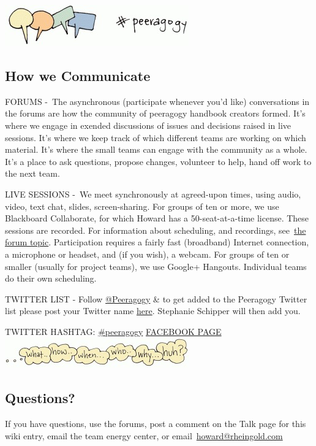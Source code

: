 \textbf{\href{http://peeragogy.org/wp-content/uploads/2012/03/communicate\_color1.gif}{\includegraphics{../pictures/communicate.jpg}}}

\subsection{How we Communicate}

FORUMS -~The asynchronous (participate whenever you'd like)
conversations in the forums are how the community of peeragogy handbook
creators formed. It's where we engage in exended discussions of issues
and decisions raised in live sessions. It's where we keep track of which
different teams are working on which material. It's where the small
teams can engage with the community as a whole. It's a place to ask
questions, propose changes, volunteer to help, hand off work to the next
team.

LIVE SESSIONS -~We meet synchronously at agreed-upon times, using audio,
video, text chat, slides, screen-sharing. For groups of ten or more, we
use Blackboard Collaborate, for which Howard has a 50-seat-at-a-time
license. These sessions are recorded. For information about scheduling,
and recordings,
see~\href{http://socialmediaclassroom.com/host/peeragogy/forum/live-sessions-schedule-recordings-notes-mindmaps}{the
forum topic}. Participation requires a fairly fast (broadband) Internet
connection, a microphone or headset, and (if you wish), a webcam. For
groups of ten or smaller (usually for project teams), we use Google+
Hangouts. Individual teams do their own scheduling.

TWITTER LIST - Follow \href{http://twitter.com/Peeragogy/}{@Peeragogy}
\& to get added to the Peeragogy Twitter list please post your Twitter
name
\href{http://socialmediaclassroom.com/host/peeragogy/forum/the-tools-we-are-using-and-how-access-them}{here}.
Stephanie Schipper will then add you.

TWITTER HASHTAG:
\href{http://twitter.com/search?q=\%23peeragogy\&src=typd}{\#peeragogy}
\href{https://www.facebook.com/peeragogy}{FACEBOOK PAGE} \textbf{~
\href{http://peeragogy.org/wp-content/uploads/2012/03/questions\_1000.gif}{\includegraphics{../pictures/questions.jpg}}}

\subsection{Questions?}

If you have questions, use the forums, post a comment on the Talk page
for this wiki entry, email the team energy center, or
email~\href{mailto:howard@rheingold.com}{howard@rheingold.com}
